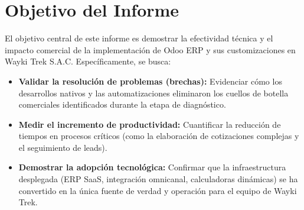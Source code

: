 \section{Objetivo del Informe}

El objetivo central de este informe es demostrar la efectividad técnica y el impacto comercial de la implementación de Odoo ERP y sus customizaciones en Wayki Trek S.A.C. Específicamente, se busca:

\begin{itemize}
    \item \textbf{Validar la resolución de problemas (brechas):} Evidenciar cómo los desarrollos nativos y las automatizaciones eliminaron los cuellos de botella comerciales identificados durante la etapa de diagnóstico.
    \item \textbf{Medir el incremento de productividad:} Cuantificar la reducción de tiempos en procesos críticos (como la elaboración de cotizaciones complejas y el seguimiento de leads).
    \item \textbf{Demostrar la adopción tecnológica:} Confirmar que la infraestructura desplegada (ERP SaaS, integración omnicanal, calculadoras dinámicas) se ha convertido en la única fuente de verdad y operación para el equipo de Wayki Trek.
\end{itemize}
